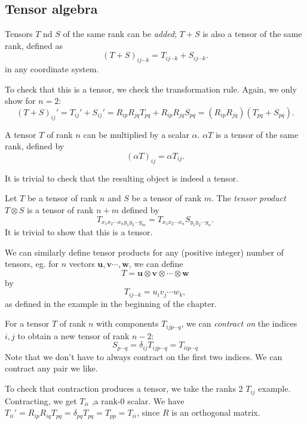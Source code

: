 \documentclass[a4paper]{article}
\begin{document}
\subsection{Tensor algebra}
\begin{defi}
  Tensors $T$ nd $S$ of the same rank can be \emph{added}; $T + S$ is also a tensor of the same rank, defined as
  \[
    (T + S)_{ij\cdots k} = T_{ij \cdots k} + S_{ij\cdots k}.
  \]
  in any coordinate system.
\end{defi}
To check that this is a tensor, we check the transformation rule. Again, we only show for $n = 2$:
\[
  (T + S)_{ij}' = T_{ij}' + S_{ij}' = R_{ip}R_{jq}T_{pq} + R_{ip}R_{jq}S_{pq} = (R_{ip}R_{jq})(T_{pq} + S_{pq}).
\]
\begin{defi}
  A tensor $T$ of rank $n$ can be multiplied by a scalar $\alpha$. $\alpha T$ is a tensor of the same rank, defined by
  \[
    (\alpha T)_{ij} = \alpha T_{ij}.
  \]
\end{defi}
It is trivial to check that the resulting object is indeed a tensor.

\begin{defi}
  Let $T$ be a tensor of rank $n$ and $S$ be a tensor of rank $m$. The \emph{tensor product} $T\otimes S$ is a tensor of rank $n + m$ defined by
  \[
    T_{x_1 x_2\cdots x_n y_1y_2\cdots y_m} = T_{x_1x_2\cdots x_n}S_{y_1y_2\cdots y_n}.
  \]
  It is trivial to show that this is a tensor.

  We can similarly define tensor products for any (positive integer) number of tensors, eg. for $n$ vectors $\mathbf{u}, \mathbf{v} \cdots, \mathbf{w}$, we can define
  \[
    T = \mathbf{u}\otimes \mathbf{v}\otimes \cdots \otimes \mathbf{w}
  \]
  by
  \[
    T_{ij\cdots k} = u_i v_j \cdots w_k,
  \]
  as defined in the example in the beginning of the chapter.
\end{defi}

\begin{defi}
  For a tensor $T$ of rank $n$ with components $T_{ijp\cdots q}$, we can \emph{contract on} the indices $i, j$ to obtain a new tensor of rank $n - 2$:
  \[
    S_{p\cdots q} = \delta_{ij}T_{ij p\cdots q} = T_{iip\cdots q}
  \]
  Note that we don't have to always contract on the first two indices. We can contract any pair we like.
\end{defi}
To check that contraction produces a tensor, we take the ranks 2 $T_{ij}$ example. Contracting, we get $T_{ii}$ ,a rank-0 scalar. We have $T_{ii}' = R_{ip}R_{iq}T_{pq} = \delta_{pq}T_{pq} = T_{pp} = T_{ii}$, since $R$ is an orthogonal matrix.
\end{document}
